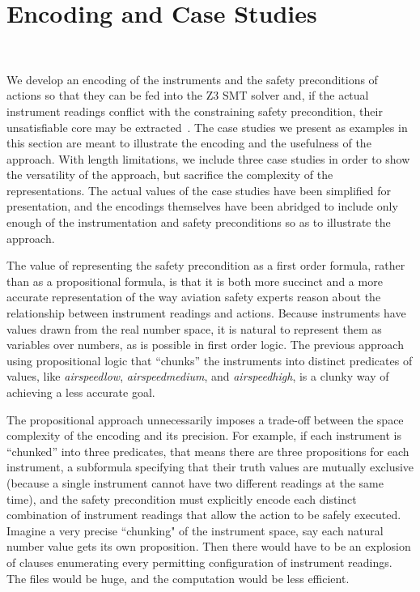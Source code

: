 \section{Encoding and Case Studies}~\label{encodings}

We develop an encoding of the instruments and the safety preconditions of actions so that they can be fed into the Z3 SMT solver and, if the actual instrument readings conflict with the constraining safety precondition, their unsatisfiable core may be extracted~\cite{z3}. The case studies we present as examples in this section are meant to illustrate the encoding and the usefulness of the approach. With length limitations, we include three case studies in order to show the versatility of the approach, but sacrifice the complexity of the representations. The actual values of the case studies have been simplified for presentation, and the encodings themselves have been abridged to include only enough of the instrumentation and safety preconditions so as to illustrate the approach.

The value of representing the safety precondition as a first order formula, rather than as a propositional formula, is that it is both more succinct and a more accurate representation of the way aviation safety experts reason about the relationship between instrument readings and actions. Because instruments have values drawn from the real number space, it is natural to represent them as variables over numbers, as is possible in first order logic. The previous approach using propositional logic that ``chunks'' the instruments into distinct predicates of values, like \emph{airspeedlow}, \emph{airspeedmedium}, and \emph{airspeedhigh}, is a clunky way of achieving a less accurate goal.

The propositional approach unnecessarily imposes a trade-off between the space complexity of the encoding and its precision. For example, if each instrument is ``chunked'' into three predicates, that means there are three propositions for each instrument, a subformula specifying that their truth values are mutually exclusive (because a single instrument cannot have two different readings at the same time), and the safety precondition must explicitly encode each distinct combination of instrument readings that allow the action to be safely executed. Imagine a very precise ``chunking" of the instrument space, say each natural number value gets its own proposition. Then there would have to be an explosion of clauses enumerating every permitting configuration of instrument readings. The files would be huge, and the computation would be less efficient. 

